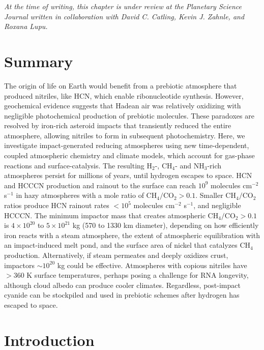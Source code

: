 
\noindent \textit{At the time of writing, this chapter is under review at the Planetary Science Journal written in collaboration with David C. Catling, Kevin J. Zahnle, and Roxana Lupu.}

\section*{\centering Summary}

The origin of life on Earth would benefit from a prebiotic atmosphere that produced nitriles, like HCN, which enable ribonucleotide synthesis. However, geochemical evidence suggests that Hadean air was relatively oxidizing with negligible photochemical production of prebiotic molecules. These paradoxes are resolved by iron-rich asteroid impacts that transiently reduced the entire atmosphere, allowing nitriles to form in subsequent photochemistry. Here, we investigate impact-generated reducing atmospheres using new time-dependent, coupled atmospheric chemistry and climate models, which account for gas-phase reactions and surface-catalysis. The resulting H$_2$-, CH$_4$- and NH$_3$-rich atmospheres persist for millions of years, until hydrogen escapes to space. HCN and HCCCN production and rainout to the surface can reach $10^9$ molecules cm$^{-2}$ s$^{-1}$ in hazy atmospheres with a mole ratio of $\mathrm{CH_4} / \mathrm{CO_2} > 0.1$. Smaller $\mathrm{CH_4} / \mathrm{CO_2}$ ratios produce HCN rainout rates $< 10^5$ molecules cm$^{-2}$ s$^{-1}$, and negligible HCCCN. The minimum impactor mass that creates atmospheric $\mathrm{CH_4} / \mathrm{CO_2} > 0.1$ is $4 \times 10^{20}$ to $5 \times 10^{21}$ kg (570 to 1330 km diameter), depending on how efficiently iron reacts with a steam atmosphere, the extent of atmospheric equilibration with an impact-induced melt pond, and the surface area of nickel that catalyzes CH$_4$ production. Alternatively, if steam permeates and deeply oxidizes crust, impactors $\sim 10^{20}$ kg could be effective. Atmospheres with copious nitriles have $> 360$ K surface temperatures, perhaps posing a challenge for RNA longevity, although cloud albedo can produce cooler climates. Regardless, post-impact cyanide can be stockpiled and used in prebiotic schemes after hydrogen has escaped to space.

\section{Introduction}

